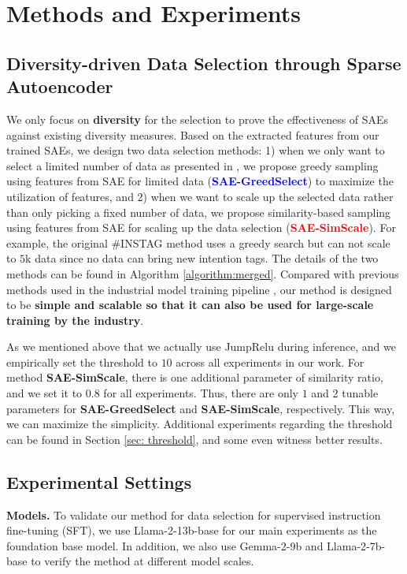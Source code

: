 \section{Methods and Experiments} 

\subsection{Diversity-driven Data Selection through Sparse Autoencoder}
We only focus on \textbf{diversity} for the selection to prove the effectiveness of SAEs against existing diversity measures.
Based on the extracted features from our trained SAEs, we design two data selection methods: 
1) when we only want to select a limited number of data as presented in \citep{chenalpagasus, zhaolong}, we propose greedy sampling using features from SAE for limited data (\textcolor{blue}{\textbf{SAE-GreedSelect}}) to maximize the utilization of features, and 
2) when we want to scale up the selected data rather than only picking a fixed number of data, we propose similarity-based sampling using features from SAE for scaling up the data selection (\textcolor{red}{\textbf{SAE-SimScale}}). For example, the original \#INSTAG \citep{lu2023instag} method uses a greedy search but can not scale to $5$k data since no data can bring new intention tags. 
The details of the two methods can be found in Algorithm \ref{algorithm:merged}.
Compared with previous methods used in the industrial model training pipeline \citep{lu2023instag}, our method is designed to be \textbf{simple and scalable so that it can also be used for large-scale training by the industry}.

As we mentioned above that we actually use JumpRelu during inference, and we empirically set the threshold to $10$ across all experiments in our work. For method \textbf{SAE-SimScale}, there is one additional parameter of similarity ratio, and we set it to $0.8$ for all experiments. Thus, there are only $1$ and $2$ tunable parameters for \textbf{SAE-GreedSelect} and \textbf{SAE-SimScale}, respectively. This way, we can maximize the simplicity.
Additional experiments regarding the threshold can be found in Section \ref{sec: threshold}, and some even witness better results.

\subsection{Experimental Settings}

\textbf{Models.} To validate our method for data selection for supervised instruction fine-tuning (SFT), we use Llama-2-13b-base for our main experiments as the foundation base model. In addition, we also use Gemma-2-9b and Llama-2-7b-base to verify the method at different model scales.

